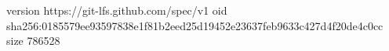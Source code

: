 version https://git-lfs.github.com/spec/v1
oid sha256:0185579ee93597838e1f81b2eed25d19452e23637feb9633c427d4f20de4c0cc
size 786528
